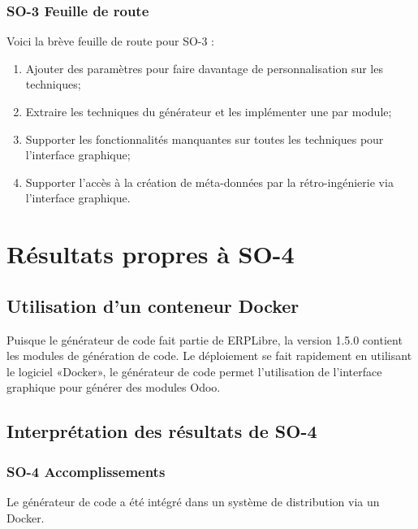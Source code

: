 \subsubsection{SO-3 Feuille de route}
Voici la brève feuille de route pour SO-3 :
\begin{enumerate}
    \item Ajouter des paramètres pour faire davantage de personnalisation sur les techniques;
    \item Extraire les techniques du générateur et les implémenter une par module;
    \item Supporter les fonctionnalités manquantes sur toutes les techniques pour l’interface graphique;
    \item Supporter l’accès à la création de méta-données par la rétro-ingénierie via l’interface graphique.
\end{enumerate}

\section{Résultats propres à SO-4}

\subsection{Utilisation d’un conteneur Docker}

Puisque le générateur de code fait partie de ERPLibre, la version 1.5.0 contient les modules de génération de code. Le déploiement se fait rapidement en utilisant le logiciel «Docker», le générateur de code permet l’utilisation de l’interface graphique pour générer des modules Odoo.

\subsection{Interprétation des résultats de SO-4}

\subsubsection{SO-4 Accomplissements}
Le générateur de code a été intégré dans un système de distribution via un Docker.

